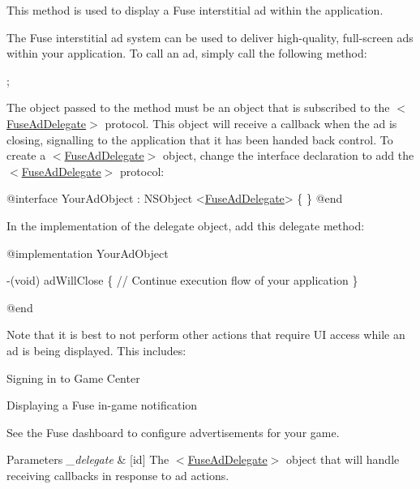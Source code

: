 This method is used to display a Fuse interstitial ad within the application. 

The Fuse interstitial ad system can be used to deliver high-\/quality, full-\/screen ads within your application. To call an ad, simply call the following method\+:


\begin{DoxyCode}
;
\end{DoxyCode}


The object passed to the method must be an object that is subscribed to the $<$\hyperlink{protocol_fuse_ad_delegate-p}{Fuse\+Ad\+Delegate}$>$ protocol. This object will receive a callback when the ad is closing, signalling to the application that it has been handed back control. To create a $<$\hyperlink{protocol_fuse_ad_delegate-p}{Fuse\+Ad\+Delegate}$>$ object, change the interface declaration to add the $<$\hyperlink{protocol_fuse_ad_delegate-p}{Fuse\+Ad\+Delegate}$>$ protocol\+:


\begin{DoxyCode}
\textcolor{keyword}{@interface }YourAdObject : NSObject <\hyperlink{protocol_fuse_ad_delegate-p}{FuseAdDelegate}> 
\{
\}
\textcolor{keyword}{@end}
\end{DoxyCode}


In the implementation of the delegate object, add this delegate method\+:


\begin{DoxyCode}
\textcolor{keyword}{@implementation }YourAdObject

-(void) adWillClose
\{
   \textcolor{comment}{// Continue execution flow of your application}
\}

\textcolor{keyword}{@end}
\end{DoxyCode}


Note that it is best to not perform other actions that require U\+I access while an ad is being displayed. This includes\+:


\begin{DoxyItemize}
\item Signing in to Game Center
\item Displaying a Fuse in-\/game notification
\end{DoxyItemize}

See the Fuse dashboard to configure advertisements for your game.


\begin{DoxyParams}{Parameters}
{\em \+\_\+delegate} & \mbox{[}id\mbox{]} The $<$\hyperlink{protocol_fuse_ad_delegate-p}{Fuse\+Ad\+Delegate}$>$ object that will handle receiving callbacks in response to ad actions. \\
\hline
\end{DoxyParams}
\hypertarget{interface_fuse_a_p_i_a77f8d91d1491f0ad94bc1f0ca3fb7993}{}
